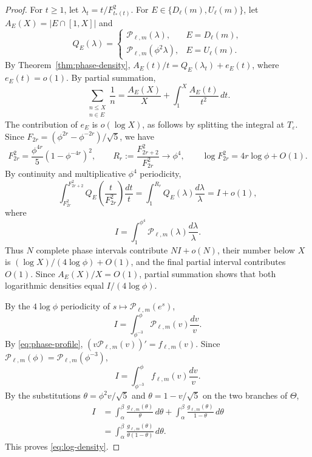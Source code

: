 \documentclass[11pt]{amsart}
\theoremstyle{definition}
\begin{document}
\begin{proof}
For $t\geq1$, let $\lambda_t=t/F_{t_*(t)}^2$.
For $E\in\{D_\ell(m),U_\ell(m)\}$, let $A_E(X)=|E\cap[1,X]|$ and
\[
 Q_E(\lambda)=
 \begin{cases}
 \mathcal P_{\ell,m}(\lambda),&E=D_\ell(m),\\
 \mathcal P_{\ell,m}(\phi^2\lambda),&E=U_\ell(m).
 \end{cases}
\]
By Theorem~\ref{thm:phase-density},
$A_E(t)/t=Q_E(\lambda_t)+e_E(t)$, where $e_E(t)=o(1)$. By partial
summation,
\[
 \sum_{\substack{n\leq X\\n\in E}}\frac1n
 =\frac{A_E(X)}X+\int_1^X\frac{A_E(t)}{t^2}\,dt.
\]
The contribution of $e_E$ is $o(\log X)$, as follows by splitting the
integral at $T_\varepsilon$. Since $F_{2r}=(\phi^{2r}-\phi^{-2r})/\sqrt5$, we have
\[
F_{2r}^2=\frac{\phi^{4r}}5(1-\phi^{-4r})^2,\qquad
R_r:=\frac{F_{2r+2}^2}{F_{2r}^2}\to\phi^4,\qquad
\log F_{2r}^2=4r\log\phi+O(1).
\]
By continuity and multiplicative $\phi^4$ periodicity,
\[
 \int_{F_{2r}^2}^{F_{2r+2}^2}
 Q_E\!\left(\frac{t}{F_{2r}^2}\right)\frac{dt}{t}
 =\int_1^{R_r}Q_E(\lambda)\frac{d\lambda}{\lambda}
 =I+o(1),
\]
where
\[
 I=\int_1^{\phi^4}\mathcal P_{\ell,m}(\lambda)
 \frac{d\lambda}{\lambda}.
\]
Thus $N$ complete phase intervals contribute $NI+o(N)$, their number
below $X$ is $(\log X)/(4\log\phi)+O(1)$, and the final partial interval
contributes $O(1)$. Since $A_E(X)/X=O(1)$, partial summation shows that
both logarithmic densities equal $I/(4\log\phi)$.

By the $4\log\phi$ periodicity of
$s\mapsto\mathcal P_{\ell,m}(e^s)$,
\[
 I=\int_{\phi^{-3}}^\phi\mathcal P_{\ell,m}(v)\frac{dv}{v}.
\]
By \eqref{eq:phase-profile},
$(v\mathcal P_{\ell,m}(v))'=f_{\ell,m}(v)$. Since
$\mathcal P_{\ell,m}(\phi)=\mathcal P_{\ell,m}(\phi^{-3})$,
\[
 I=\int_{\phi^{-3}}^\phi f_{\ell,m}(v)\frac{dv}{v}.
\]
By the substitutions $\theta=\phi^2v/\sqrt5$ and
$\theta=1-v/\sqrt5$ on the two branches of $\Theta$,
\[
\begin{aligned}
 I&=\int_\alpha^\beta\frac{g_{\ell,m}(\theta)}{\theta}\,d\theta
   +\int_\alpha^\beta\frac{g_{\ell,m}(\theta)}{1-\theta}\,d\theta\\
  &=\int_\alpha^\beta
    \frac{g_{\ell,m}(\theta)}{\theta(1-\theta)}\,d\theta.
\end{aligned}
\]
This proves \eqref{eq:log-density}.
\end{proof}
\end{document}
